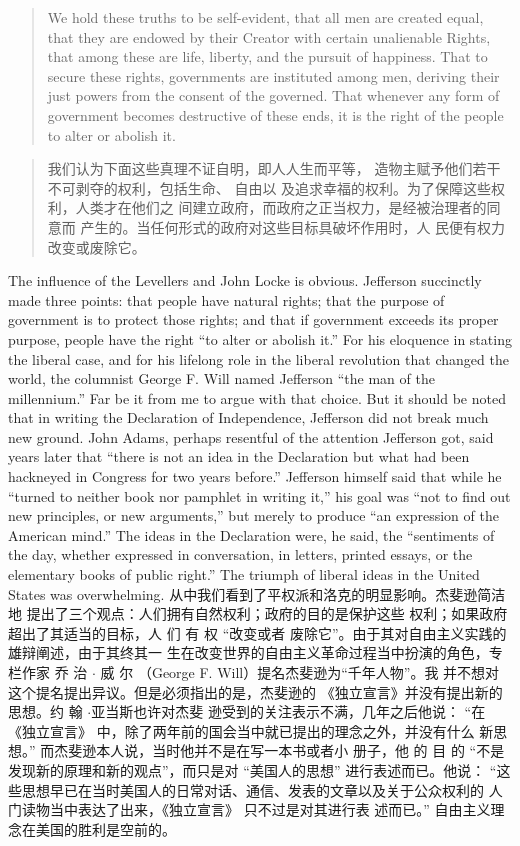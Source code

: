 \begin{paracol}{2}
\begin{quote}
We hold these truths to be self-evident, that all men are created
equal, that they are endowed by their Creator with certain unalienable Rights, that among these are life, liberty, and the pursuit of happiness. That to secure these rights, governments are
instituted among men, deriving their just powers from the consent of the governed. That whenever any form of government becomes destructive of these ends, it is the right of the people to
alter or abolish it.
\end{quote}
\switchcolumn
\begin{quote}
我们认为下面这些真理不证自明，即人人生而平等，
造物主赋予他们若干不可剥夺的权利，包括生命、 自由以
及追求幸福的权利。为了保障这些权利，人类才在他们之
间建立政府，而政府之正当权力，是经被治理者的同意而
产生的。当任何形式的政府对这些目标具破坏作用时，人
民便有权力改变或废除它。
\end{quote}
\switchcolumn*
The influence of the Levellers and John Locke is obvious. Jefferson succinctly made three points: that people have natural
rights; that the purpose of government is to protect those
rights; and that if government exceeds its proper purpose, people have the right ``to alter or abolish it.'' For his eloquence in
stating the liberal case, and for his lifelong role in the liberal
revolution that changed the world, the columnist George F.
Will named Jefferson ``the man of the millennium.'' Far be it
from me to argue with that choice. But it should be noted that
in writing the Declaration of Independence, Jefferson did not
break much new ground. John Adams, perhaps resentful of the
attention Jefferson got, said years later that ``there is not an idea in the Declaration but what had been hackneyed in Congress for two years before.'' Jefferson himself said that while he ``turned to neither book nor pamphlet in writing it,'' his goal
was ``not to find out new principles, or new arguments,'' but
merely to produce ``an expression of the American mind.'' The
ideas in the Declaration were, he said, the ``sentiments of the
day, whether expressed in conversation, in letters, printed essays, or the elementary books of public right.'' The triumph of liberal ideas in the United States was overwhelming.
\switchcolumn
从中我们看到了平权派和洛克的明显影响。杰斐逊简洁地
提出了三个观点：人们拥有自然权利；政府的目的是保护这些
权利；如果政府超出了其适当的目标，人 们 有 权 “改变或者
废除它”。由于其对自由主义实践的雄辩阐述，由于其终其一
生在改变世界的自由主义革命过程当中扮演的角色，专栏作家
乔 治 $\cdot$ 威 尔 （George F. Will）提名杰斐逊为“千年人物”。我
并不想对这个提名提出异议。但是必须指出的是，杰斐逊的
《独立宣言》并没有提出新的思想。约 翰 $\cdot$亚当斯也许对杰斐
逊受到的关注表示不满，几年之后他说： “在 《独立宣言》
中，除了两年前的国会当中就已提出的理念之外，并没有什么
新思想。” 而杰斐逊本人说，当时他并不是在写一本书或者小
册子，他 的 目 的 “不是发现新的原理和新的观点”，而只是对
“美国人的思想” 进行表述而已。他说： “这些思想早已在当时美国人的日常对话、通信、发表的文章以及关于公众权利的
人门读物当中表达了出来，《独立宣言》 只不过是对其进行表
述而已。” 自由主义理念在美国的胜利是空前的。


\end{paracol}
